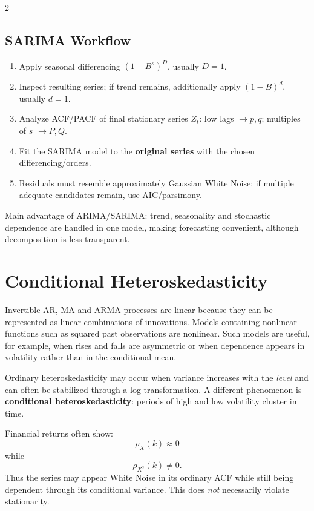 \documentclass[9pt,a4paper]{extarticle}
\newcommand{\key}[1]{\textbf{#1}}
\begin{document}
\begin{multicols}{2}
\subsection{SARIMA Workflow}

\begin{enumerate}
\item Apply seasonal differencing \((1-B^s)^D\), usually \(D=1\).
\item Inspect resulting series; if trend remains, additionally apply \((1-B)^d\), usually \(d=1\).
\item Analyze ACF/PACF of final stationary series \(Z_t\): low lags \(\to p,q\); multiples of \(s\) \(\to P,Q\).
\item Fit the SARIMA model to the \key{original series} with the chosen differencing/orders.
\item Residuals must resemble approximately Gaussian White Noise; if multiple adequate candidates remain, use AIC/parsimony.
\end{enumerate}

Main advantage of ARIMA/SARIMA: trend, seasonality and stochastic dependence are handled in one model, making forecasting convenient, although decomposition is less transparent.

\section{Conditional Heteroskedasticity}

Invertible AR, MA and ARMA processes are linear because they can be represented as linear combinations of innovations. Models containing nonlinear functions such as squared past observations are nonlinear. Such models are useful, for example, when rises and falls are asymmetric or when dependence appears in volatility rather than in the conditional mean.

Ordinary heteroskedasticity may occur when variance increases with the \emph{level} and can often be stabilized through a log transformation. A different phenomenon is \key{conditional heteroskedasticity}: periods of high and low volatility cluster in time.

Financial returns often show:
\[
\boxed{\rho_X(k)\approx0}
\]
while
\[
\boxed{\rho_{X^2}(k)\neq0}.
\]
Thus the series may appear White Noise in its ordinary ACF while still being dependent through its conditional variance. This does \emph{not} necessarily violate stationarity.


\end{multicols}
\end{document}
